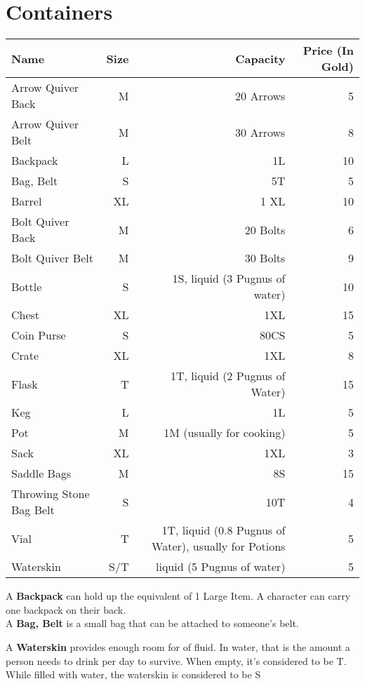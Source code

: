 \section{Containers}\label{sec:containers}
\begin{longtable}{l | r | r | r}
	Name & Size & Capacity & Price (In Gold)\\ \hline
	Arrow Quiver Back & M & 20 Arrows & 5 \\
	Arrow Quiver Belt & M & 30 Arrows & 8 \\
	Backpack & L & 1L & 10 \\
	Bag, Belt & S & 5T & 5 \\
	Barrel & XL & 1 XL & 10 \\
	Bolt Quiver Back & M & 20 Bolts & 6 \\
	Bolt Quiver Belt & M & 30 Bolts & 9 \\
	Bottle & S & 1S, liquid (3 Pugnus of water) & 10 \\
	Chest & XL & 1XL & 15 \\
	Coin Purse & S & 80CS & 5 \\
	Crate & XL & 1XL & 8 \\
	Flask & T & 1T, liquid (2 Pugnus of Water) & 15 \\
	Keg & L & 1L & 5 \\
	Pot & M & 1M (usually for cooking) & 5 \\
	Sack & XL & 1XL & 3 \\
	Saddle Bags & M & 8S & 15 \\
	Throwing Stone Bag Belt & S & 10T & 4 \\
	Vial & T & 1T, liquid (0.8 Pugnus of Water), usually for Potions & 5 \\
	Waterskin & S/T & liquid (5 Pugnus of water) & 5 \\
\end{longtable}

A \textbf{Backpack} can hold up the equivalent of 1 Large Item.
A character can carry one backpack on their back.\\

A \textbf{Bag, Belt} is a small bag that can be attached to someone's belt.

A \textbf{Waterskin} provides enough room for  of fluid.
In water, that is the amount a person needs to drink per day to survive.
When empty, it's considered to be T.
While filled with water, the waterskin is considered to be S\\
